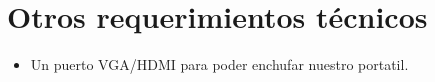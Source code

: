 \documentclass[runningheads]{llncs}
\begin{document}
\section{Otros requerimientos t\'ecnicos}
\begin{itemize}
 \item Un puerto VGA/HDMI para poder enchufar nuestro portatil.
\end{itemize}

\clearpage



\end{document}

